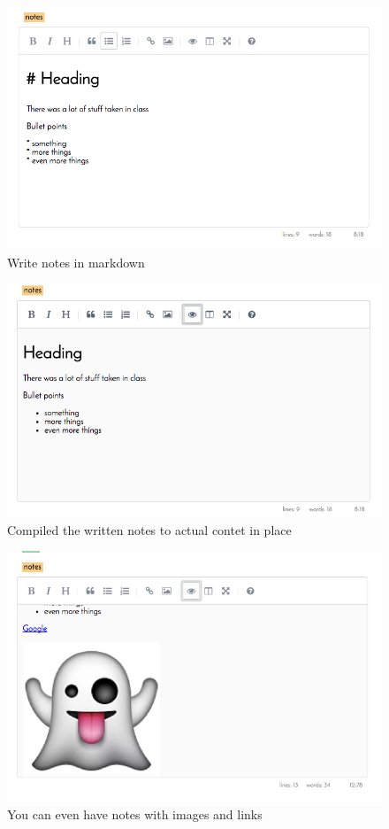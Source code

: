 \documentclass{article}
\begin{document}
\begin{figure}
  \includegraphics[width=\linewidth]{notesmd.png}
  \caption{Write notes in markdown}
\end{figure}

\begin{figure}
  \includegraphics[width=\linewidth]{notescompiled.png}
  \caption{Compiled the written notes to actual contet in place}
\end{figure}

\begin{figure}
  \includegraphics[width=\linewidth]{noteswithimages.png}
  \caption{You can even have notes with images and links}
\end{figure}
\end{document}
